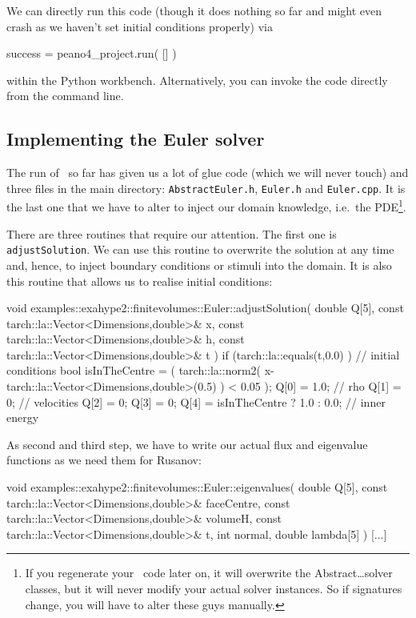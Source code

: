 \noindent
We can directly run this code (though it does nothing so far and might even
crash as we haven't set initial conditions properly) via
\begin{code}
success = peano4_project.run( [] )
\end{code}
within the Python workbench. 
Alternatively, you can invoke the code directly from the command line. 



\subsection{Implementing the Euler solver}

The run of \ExaHyPE\ so far has given us a lot of glue code (which we will
never touch) and three files in the main directory:
\texttt{AbstractEuler.h}, \texttt{Euler.h} and \texttt{Euler.cpp}.
It is the last one that we have to alter to inject our domain knowledge,
i.e.~the PDE\footnote{If you regenerate your \ExaHyPE\ code later on, it will
overwrite the Abstract\ldots solver classes, but it will never modify your
actual solver instances. So if signatures change, you will have to alter these
guys manually.}.


There are three routines that require our attention.
The first one is \texttt{adjustSolution}.
We can use this routine to overwrite the solution at any time and, hence, to
inject boundary conditions or stimuli into the domain.
It is also this routine that allows us to realise initial conditions:
\begin{code}
void examples::exahype2::finitevolumes::Euler::adjustSolution(
  double Q[5],
  const tarch::la::Vector<Dimensions,double>&  x,
  const tarch::la::Vector<Dimensions,double>&  h,
  const tarch::la::Vector<Dimensions,double>&  t
) {
  if (tarch::la::equals(t,0.0) ) {
    // initial conditions
    bool isInTheCentre = ( tarch::la::norm2( x-tarch::la::Vector<Dimensions,double>(0.5) ) < 0.05 );
    Q[0] = 1.0;  // rho
    Q[1] = 0;    // velocities
    Q[2] = 0;
    Q[3] = 0;
    Q[4] = isInTheCentre ? 1.0 : 0.0; // inner energy
  }
}
\end{code}


\noindent
As second and third step, we have to write our actual flux and eigenvalue
functions as we need them for Rusanov:


\begin{code}
void examples::exahype2::finitevolumes::Euler::eigenvalues(
  double                                       Q[5],
  const tarch::la::Vector<Dimensions,double>&  faceCentre,
  const tarch::la::Vector<Dimensions,double>&  volumeH,
  const tarch::la::Vector<Dimensions,double>&  t,
  int                                          normal,
  double                                       lambda[5]
) {
  [...]
}
\end{code}



